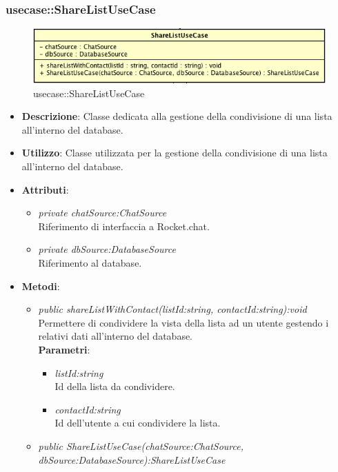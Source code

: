 \subsubsection{usecase::ShareListUseCase}

\label{usecase::ShareListUseCase}
\begin{figure}[ht]
	\centering
	\includegraphics[scale=0.5]{Sezioni/SottosezioniST/img/app/ShareListUseCase.png}
	\caption{usecase::ShareListUseCase}
\end{figure}

\begin{itemize}
\item \textbf{Descrizione}: Classe dedicata alla gestione della condivisione di una lista all'interno del database.
\item \textbf{Utilizzo}: Classe utilizzata per la gestione della condivisione di una lista all'interno del database.
\item \textbf{Attributi}: 
\begin{itemize}
\item \textit{private chatSource:ChatSource}\\
	Riferimento di interfaccia a Rocket.chat.
\item \textit{private dbSource:DatabaseSource}\\
	Riferimento al database.
\end{itemize}
\item \textbf{Metodi}:
\begin{itemize}
\item \textit{public shareListWithContact(listId:string, contactId:string):void}\\
	Permettere di condividere la vista della lista ad un utente gestendo i relativi dati all'interno del database.
	\\ \textbf{Parametri}: \begin{itemize}
	\item \textit{listId:string}\\
	Id della lista da condividere.
	\item \textit{contactId:string}\\
	Id dell'utente a cui condividere la lista.
	\end{itemize} 
\item \textit{public ShareListUseCase(chatSource:ChatSource, dbSource:DatabaseSource):ShareListUseCase}\\

\end{itemize}
\end{itemize}
